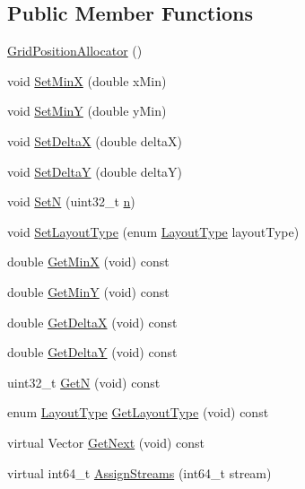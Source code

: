 \subsection*{Public Member Functions}
\begin{DoxyCompactItemize}
\item 
\hyperlink{classns3_1_1GridPositionAllocator_a910d9ecd1307dc2c7abf49e833d2286b}{Grid\+Position\+Allocator} ()
\item 
void \hyperlink{classns3_1_1GridPositionAllocator_afa436e4b24bbf4c0211ccf5edc95668f}{Set\+MinX} (double x\+Min)
\item 
void \hyperlink{classns3_1_1GridPositionAllocator_a60b06717ad8226c42377416426aba40d}{Set\+MinY} (double y\+Min)
\item 
void \hyperlink{classns3_1_1GridPositionAllocator_a00569b8c7d45fbad026cf8e9c52ad1ff}{Set\+DeltaX} (double deltaX)
\item 
void \hyperlink{classns3_1_1GridPositionAllocator_a78592336a3ae492ef979a3382b892f78}{Set\+DeltaY} (double deltaY)
\item 
void \hyperlink{classns3_1_1GridPositionAllocator_ae2ac6cad1a3898c7edcfaf7577fff169}{SetN} (uint32\+\_\+t \hyperlink{lte__link__budget__x2__handover__measures_8m_abdb05bc5a064cf642a06c83b3392f148}{n})
\item 
void \hyperlink{classns3_1_1GridPositionAllocator_a9d6c1ac28dab841823c232409106bc4f}{Set\+Layout\+Type} (enum \hyperlink{classns3_1_1GridPositionAllocator_a31cab553ee810e780d5dce3ed4336b15}{Layout\+Type} layout\+Type)
\item 
double \hyperlink{classns3_1_1GridPositionAllocator_ae8a5471a4e7112367644d37323938f41}{Get\+MinX} (void) const 
\item 
double \hyperlink{classns3_1_1GridPositionAllocator_a8d91baf33dc40291d431a29897d2d497}{Get\+MinY} (void) const 
\item 
double \hyperlink{classns3_1_1GridPositionAllocator_a21f32562336f08c03e0a802ae5ab693f}{Get\+DeltaX} (void) const 
\item 
double \hyperlink{classns3_1_1GridPositionAllocator_a2589e2a555e557ddb74af650e626f296}{Get\+DeltaY} (void) const 
\item 
uint32\+\_\+t \hyperlink{classns3_1_1GridPositionAllocator_a398a6cbaa796db39e649e48856b1bc92}{GetN} (void) const 
\item 
enum \hyperlink{classns3_1_1GridPositionAllocator_a31cab553ee810e780d5dce3ed4336b15}{Layout\+Type} \hyperlink{classns3_1_1GridPositionAllocator_a0e8594b76cb8a578aa47a7859302c7b0}{Get\+Layout\+Type} (void) const 
\item 
virtual Vector \hyperlink{classns3_1_1GridPositionAllocator_a05abf9d0a1c00d3f5ccec846bb27f77d}{Get\+Next} (void) const 
\item 
virtual int64\+\_\+t \hyperlink{classns3_1_1GridPositionAllocator_a4a9df9514ec0a117f42bd34345f8a9fc}{Assign\+Streams} (int64\+\_\+t stream)
\end{DoxyCompactItemize}
